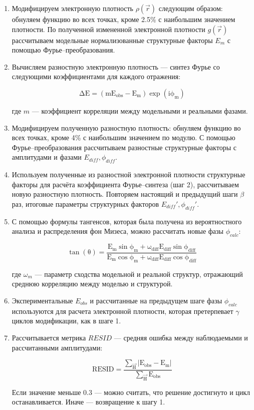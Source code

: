 \begin{enumerate}
	\item Модифицируем электронную плотность $\rho(\overrightarrow{r})$ следующим образом: обнуляем функцию во всех точках, кроме 2.5\% с наибольшим значением плотности. По полученной измененной электронной плотности $g(\overrightarrow{r})$ рассчитываем модельные нормализованные структурные факторы $E_m$ с помощью Фурье--преобразования.
	\item Вычисляем разностную электронную плотность --- синтез Фурье со следующими коэффициентами для каждого отражения:
	
	\begin{equation}
		\mathrm{\Delta E = (mE_{obs} - E_m)\exp(i\phi_m)}
	\end{equation}
		
	где $m$ --- коэффициент корреляции между модельными и реальными фазами.
	
	\item Модифицируем полученную разностную плотность: обнуляем функцию во всех точках, кроме 4\% с наибольшим значением по модулю. С помощью Фурье--преобразования рассчитываем разностные структурные факторы с амплитудами и фазами $E_{diff}, \phi_{diff}$.
	
	\item Используем полученные из разностной электронной плотности структурные факторы для расчёта коэффициента Фурье--синтеза (шаг 2), рассчитываем новую разностную плотность. Повторяем настоящий и предыдущий шаги $\beta$ раз, итоговые параметры структурных факторов $E_{diff}', \phi_{diff}'$.
	
	\item С помощью формулы тангенсов, которая была получена из вероятностного анализа и распределения фон Мизеса, можно рассчитать новые фазы $\phi_{calc}$:
	
	\begin{equation}
		\mathrm{\tan(\theta) = \frac{E_m\sin\phi_m+\omega_{diff}E_{diff}\sin\phi_{diff}}{E_m\cos\phi_m+\omega_{diff}E_{diff}\cos\phi_{diff}}}
	\end{equation}
	
	где $\omega_m$ --- параметр сходства модельной и реальной структур, отражающий среднюю корреляцию между моделью и структурой.
	
	\item Экспериментальные $E_{obs}$ и рассчитанные на предыдущем шаге фазы $\phi_{calc}$ используются для расчета электронной плотности, которая претерпевает $\gamma$ циклов модификации, как в шаге 1. 
	
	\item Рассчитывается метрика $RESID$ --- средняя ошибка между наблюдаемыми и рассчитанными амплитудами:
	
	\begin{equation}
		\mathrm{RESID = \frac{\sum_{\overrightarrow{H}}|E_{obs} - E_m|}{\sum_{\overrightarrow{H}}E_{obs}}}
	\end{equation}

	Если значение меньше 0.3 --- можно считать, что решение достигнуто и цикл останавливается. Иначе --- возвращение к шагу 1.
\end{enumerate}



